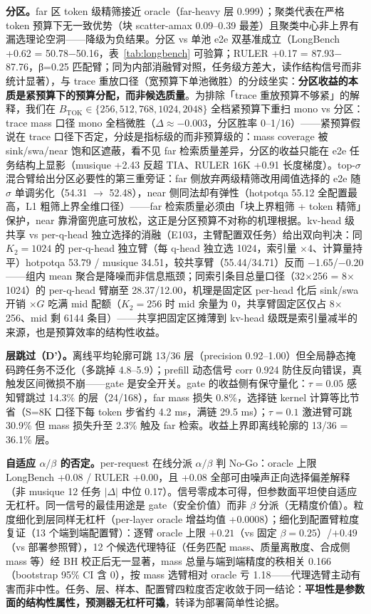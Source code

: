 \documentclass[11pt]{article}
\begin{document}
\textbf{分区。}far 区 token 级精筛接近 oracle（far-heavy 层 0.999）；聚类代表在严格 token 预算下无一致优势（块 scatter-amax 0.09--0.39 最差）且聚类中心非上界有漏选理论空洞——降级为负结果。分区 vs 单池 e2e 双基准成立（LongBench +0.62 = 50.78$-$50.16，表~\ref{tab:longbench} 可验算；RULER +0.17 = 87.93$-$87.76，β=0.25 匹配臂；同为内部消融臂对照，任务级方差大，读作结构信号而非统计显著），与 trace 重放口径（宽预算下单池微胜）的分歧坐实：\textbf{分区收益的本质是紧预算下的预算分配，而非候选质量}。为排除「trace 重放预算不够紧」的解释，我们在 $B_{\mathrm{TOK}}\in\{256,512,768,1024,2048\}$ 全档紧预算下重扫 mono vs 分区：trace mass 口径 mono 全档微胜（$\Delta\approx-0.003$，分区胜率 0--1/16）——紧预算假说在 trace 口径下否定，分歧是指标级的而非预算级的：mass coverage 被 sink/swa/near 饱和区遮蔽，看不见 far 检索质量差异，分区的收益只能在 e2e 任务结构上显影（musique +2.43 反超 TIA、RULER 16K +0.91 长度梯度）。top-$\sigma$ 混合臂给出分区必要性的第三重旁证：far 侧放弃两级精筛改用阈值选择的 e2e 随 $\sigma$ 单调劣化（54.31 $\rightarrow$ 52.48），near 侧同法却有弹性（hotpotqa 55.12 全配置最高，L1 粗筛上界全维口径）——far 检索质量必须由「块上界粗筛 + token 精筛」保护，near 靠滑窗兜底可放松，这正是分区预算不对称的机理根据。kv-head 级共享 vs per-q-head 独立选择的消融（E103，主臂配置双任务）给出双向判决：同 $K_2{=}1024$ 的 per-q-head 独立臂（每 q-head 独立选 1024，索引量 $\times$4、计算量持平）hotpotqa 53.79 / musique 34.51，较共享臂（55.44/34.71）反而 $-$1.65/$-$0.20——组内 mean 聚合是降噪而非信息瓶颈；同索引条目总量口径（32$\times$256 = 8$\times$1024）的 per-q-head 臂崩至 28.37/12.00，机理是固定区 per-head 化后 sink/swa 开销 $\times G$ 吃满 mid 配额（$K_2{=}256$ 时 mid 余量为 0，共享臂固定区仅占 8$\times$256、mid 剩 6144 条目）——共享把固定区摊薄到 kv-head 级既是索引量减半的来源，也是预算效率的结构性收益。

\textbf{层跳过（D'）。}离线平均轮廓可跳 13/36 层（precision 0.92--1.00）但全局静态掩码跨任务不泛化（多跳掉 4.8--5.9）；prefill 动态信号 corr 0.924 防住反向错误，真触发区间微损不崩——gate 是安全开关。gate 的收益侧有保守量化：$\tau{=}0.05$ 感知臂跳过 14.3\% 的层（24/168），far mass 损失 0.8\%，选择链 kernel 计算等比节省（S=8K 口径下每 token 步省约 4.2 ms，满链 29.5 ms）；$\tau{=}0.1$ 激进臂可跳 30.9\% 但 mass 损失升至 2.3\% 触及 far 检索。收益上界即离线轮廓的 13/36 = 36.1\% 层。

\textbf{自适应 $\alpha/\beta$ 的否定。}per-request 在线分派 $\alpha/\beta$ 判 No-Go：oracle 上限 LongBench +0.08 / RULER +0.00，且 +0.08 全部可由噪声正向选择偏差解释（非 musique 12 任务 $|\Delta|$ 中位 0.17）。信号零成本可得，但参数面平坦使自适应无杠杆。同一信号的最佳用途是 gate（安全价值）而非 $\beta$ 分派（无精度价值）。粒度细化到层同样无杠杆（per-layer oracle 增益均值 +0.0008）；细化到配置臂粒度复证（13 个端到端配置臂）：逐臂 oracle 上限 $+0.21$（vs 固定 $\beta{=}0.25$）/$+0.49$（vs 部署参照臂），12 个候选代理特征（任务匹配 mass、质量离散度、合成侧 mass 等）经 BH 校正后无一显著，mass 总量与端到端精度的秩相关 0.166（bootstrap 95\% CI 含 0），按 mass 选臂相对 oracle 亏 1.18——代理选臂主动有害而非中性。任务、层、样本、配置臂四粒度否定收敛于同一结论：\textbf{平坦性是参数面的结构性属性，预测器无杠杆可撬}，转译为部署简单性论据。
\end{document}
